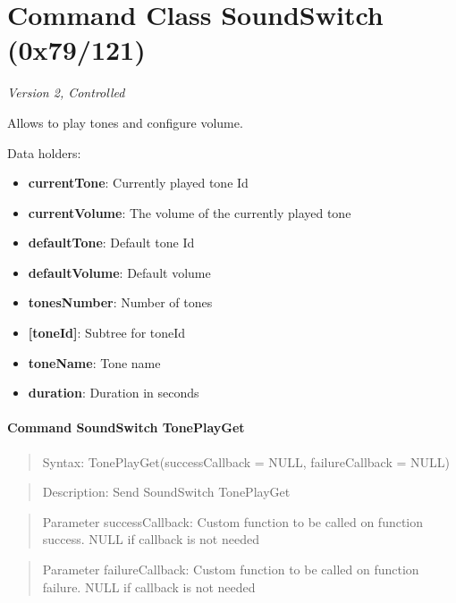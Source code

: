 \section{Command Class SoundSwitch (0x79/121)}

\textit{Version 2, Controlled}
\newline

Allows to play tones and configure volume.
\newline

\noindent
Data holders:

\begin{itemize}
\item \textbf{currentTone}: Currently played tone Id
\item \textbf{currentVolume}: The volume of the currently played tone
\item \textbf{defaultTone}: Default tone Id
\item \textbf{defaultVolume}: Default volume
\item \textbf{tonesNumber}: Number of tones
\item \textbf{[toneId]}: Subtree for toneId
\item \qquad\textbf{toneName}: Tone name
\item \qquad\textbf{duration}: Duration in seconds
\end{itemize}

\paragraph{Command SoundSwitch TonePlayGet}
\begin{quote}Syntax: TonePlayGet(successCallback = NULL, failureCallback = NULL)\end{quote}
\begin{quote}Description: Send SoundSwitch TonePlayGet\end{quote}
\begin{quote}Parameter successCallback: Custom function to be called on function success. NULL if callback is not needed\end{quote}
\begin{quote}Parameter failureCallback: Custom function to be called on function failure. NULL if callback is not needed\end{quote}


